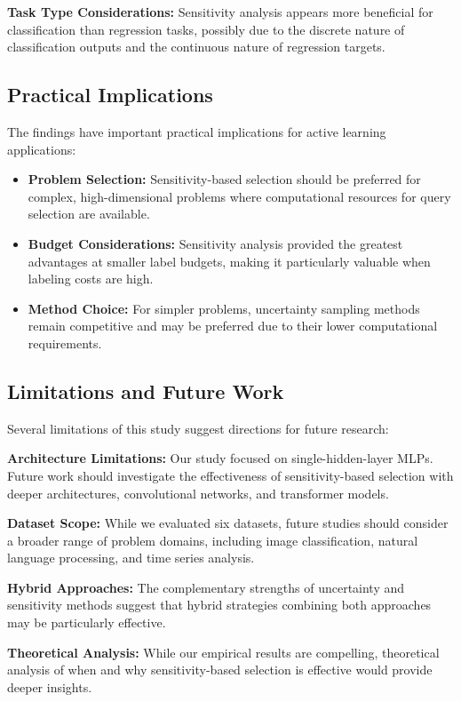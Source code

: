 \documentclass[conference]{IEEEtran}
\begin{document}
\textbf{Task Type Considerations:} Sensitivity analysis appears more beneficial for classification than regression tasks, possibly due to the discrete nature of classification outputs and the continuous nature of regression targets.

\subsection{Practical Implications}

The findings have important practical implications for active learning applications:

\begin{itemize}
\item \textbf{Problem Selection:} Sensitivity-based selection should be preferred for complex, high-dimensional problems where computational resources for query selection are available.
\item \textbf{Budget Considerations:} Sensitivity analysis provided the greatest advantages at smaller label budgets, making it particularly valuable when labeling costs are high.
\item \textbf{Method Choice:} For simpler problems, uncertainty sampling methods remain competitive and may be preferred due to their lower computational requirements.
\end{itemize}

\subsection{Limitations and Future Work}

Several limitations of this study suggest directions for future research:

\textbf{Architecture Limitations:} Our study focused on single-hidden-layer MLPs. Future work should investigate the effectiveness of sensitivity-based selection with deeper architectures, convolutional networks, and transformer models.

\textbf{Dataset Scope:} While we evaluated six datasets, future studies should consider a broader range of problem domains, including image classification, natural language processing, and time series analysis.

\textbf{Hybrid Approaches:} The complementary strengths of uncertainty and sensitivity methods suggest that hybrid strategies combining both approaches may be particularly effective.

\textbf{Theoretical Analysis:} While our empirical results are compelling, theoretical analysis of when and why sensitivity-based selection is effective would provide deeper insights.
\end{document}
